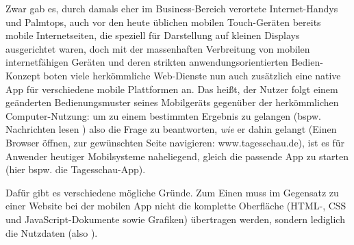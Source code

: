 Zwar gab es, durch damals eher im Business-Bereich verortete Internet-Handys und Palmtops, auch vor den heute üblichen mobilen Touch-Geräten bereits mobile Internetseiten, die speziell für Darstellung auf kleinen Displays ausgerichtet waren, doch mit der massenhaften Verbreitung von mobilen internetfähigen Geräten und deren strikten anwendungsorientierten Bedien-Konzept boten viele herkömmliche Web-Dienste nun auch zusätzlich eine native App für verschiedene mobile Plattformen an. 
Das heißt, der Nutzer folgt einem geänderten Bedienungsmuster seines Mobilgeräts gegenüber der herkömmlichen Computer-Nutzung: um zu einem bestimmten Ergebnis zu gelangen (bspw. \glqq Nachrichten lesen \grqq) also die Frage zu beantworten, \emph{wie} er dahin gelangt (Einen Browser öffnen, zur gewünschten Seite navigieren: www.tagesschau.de), ist es für Anwender heutiger Mobilsysteme naheliegend, gleich die passende App zu starten (hier bspw. die Tagesschau-App).

Dafür gibt es verschiedene mögliche Gründe. Zum Einen muss im Gegensatz zu einer Website bei der mobilen App nicht die komplette Oberfläche (HTML-, CSS und JavaScript-Dokumente sowie Grafiken) übertragen werden, sondern lediglich die Nutzdaten (also ).



\subsection{}









